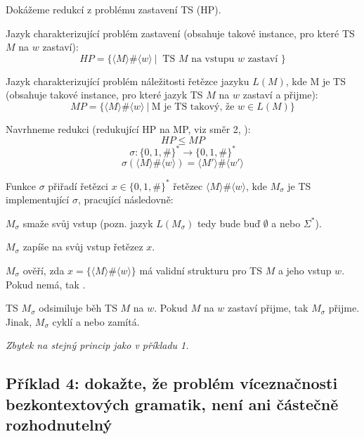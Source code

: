 \begin{compactitem}
    \item Dokážeme redukcí z problému zastavení TS (HP).

    \item Jazyk charakterizující problém zastavení (obsahuje takové instance, pro které TS $M$ na $w$ zastaví):
    $$ HP = \{ \langle M \rangle \# \langle w \rangle ~|~ \text{ TS } M \text{ na vstupu } w \text{ zastaví } \} $$

    \item Jazyk charakterizující problém náležitosti řetězce jazyku $L(M)$, kde M je TS (obsahuje takové instance, pro které jazyk TS $M$ na $w$ zastaví a přijme):
    $$ MP = \{ \langle M \rangle \# \langle w \rangle ~|~ \text{M je TS takový, že } w \in L(M) \} $$

    \item Navrhneme redukci (redukující HP na MP, viz směr 2, ):
    $$ HP \leq MP $$
    $$ \sigma : \{ 0, 1, \# \}^* \rightarrow \{ 0, 1, \# \}^* $$
    $$ \sigma(\langle M \rangle \# \langle w \rangle) = \langle M' \rangle \# \langle w' \rangle $$

    \item Funkce $\sigma$ přiřadí řetězci $x \in \{ 0, 1, \# \}^*$ řetězec $\langle M \rangle \# \langle w \rangle$, kde $M_{\sigma}$ je TS implementující $\sigma$, pracující následovně: \begin{compactitem}

        \item $M_{\sigma}$ smaže svůj vstup (pozn. jazyk $L(M_{\sigma})$ tedy bude buď $\emptyset$ a nebo $\Sigma^*$).

        \item $M_{\sigma}$ zapíše na svůj vstup řetězez $x$.

        \item $M_{\sigma}$ ověří, zda $x = \{ \langle M \rangle \# \langle w \rangle \}$ má validní strukturu pro TS $M$ a jeho vstup $w$. Pokud nemá, tak .

        \item TS $M_{\sigma}$ odsimiluje běh TS $M$ na $w$. Pokud $M$ na $w$ zastaví přijme, tak $M_{\sigma}$ přijme. Jinak, $M_{\sigma}$ cyklí a nebo zamítá.
    \end{compactitem}

    \item \textit{Zbytek na stejný princip jako v příkladu 1.}
\end{compactitem}

\subsection*{Příklad 4: dokažte, že problém víceznačnosti bezkontextových gramatik, není ani částečně rozhodnutelný}


